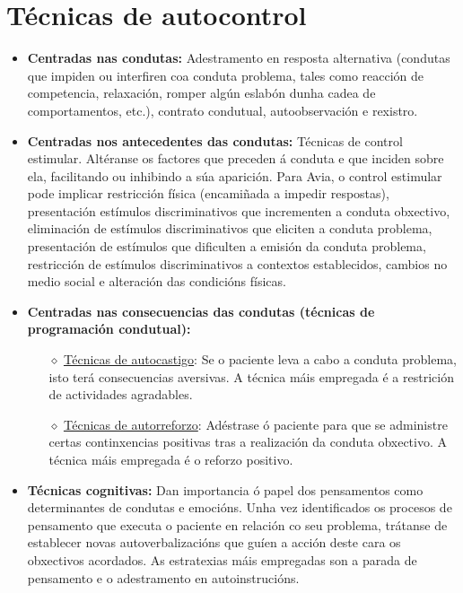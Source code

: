 \documentclass[a4paper,11pt]{article}
\begin{document}
\section{Técnicas de autocontrol}
\begin{itemize}
	\item \textbf{Centradas nas condutas:} Adestramento en resposta alternativa (condutas que impiden 
	ou interfiren coa conduta problema, tales como reacción de competencia, relaxación, romper algún 
	eslabón dunha cadea de comportamentos, etc.), contrato condutual, autoobservación e rexistro.
	\item \textbf{Centradas nos antecedentes das condutas:} Técnicas de control estimular. Altéranse 
	os factores que preceden á conduta e que inciden sobre ela, facilitando ou inhibindo a súa  
	aparición. Para Avia, o control estimular pode implicar restricción física (encamiñada a impedir 
	respostas), presentación estímulos discriminativos que incrementen a conduta obxectivo, 
	eliminación de estímulos discriminativos que eliciten a conduta problema, presentación de 
	estímulos que dificulten a emisión da conduta problema, restricción de estímulos discriminativos 
	a contextos establecidos, cambios no medio social e alteración das condicións físicas. 
	\item \textbf{Centradas nas consecuencias das condutas (técnicas de programación condutual):}
	\begin{itemize}
		\item[$\diamond$] \underline{Técnicas de autocastigo}: Se o paciente leva a cabo a conduta 
		problema, isto terá consecuencias aversivas. A técnica máis empregada é a restrición de 
		actividades agradables.
		\item[$\diamond$] \underline{Técnicas de autorreforzo}: Adéstrase ó paciente para que se 
		administre certas continxencias positivas tras a realización da conduta obxectivo. A técnica 
		máis empregada é o reforzo positivo.
	\end{itemize}
	\item \textbf{Técnicas cognitivas:} Dan importancia ó papel dos pensamentos como determinantes de 
	condutas e emocións. Unha vez identificados os procesos de pensamento que executa o paciente en 
	relación co seu problema, trátanse de establecer novas autoverbalizacións que guíen a acción 
	deste cara os obxectivos acordados. As estratexias máis empregadas son a parada de pensamento e o 
	adestramento en autoinstrucións.
\end{itemize}
\end{document}
